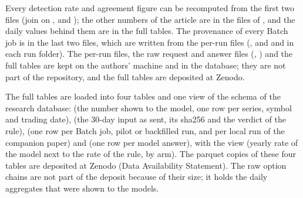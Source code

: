 Every detection rate and agreement figure can be recomputed from the first two files (join on ,  and ); the other numbers of the article are in the files of , and the daily values behind them are in the full tables. The provenance of every Batch job is in the last two files, which are written from the per-run files (, and  and  in each run folder). The per-run files, the raw request and answer files (, ) and the full tables are kept on the authors' machine and in the database; they are not part of the repository, and the full tables are deposited at Zenodo.

The full tables are loaded into four tables and one view of the schema  of the research database:  (the number shown to the model, one row per series, symbol and trading date),  (the 30-day input as sent, its sha256 and the verdict of the rule),  (one row per Batch job, pilot or backfilled run, and per local run of the companion paper) and  (one row per model answer), with the view  (yearly rate of the model next to the rate of the rule, by arm). The parquet copies of these four tables are deposited at Zenodo (Data Availability Statement). The raw option chains are not part of the deposit because of their size; it holds the daily aggregates that were shown to the models.
